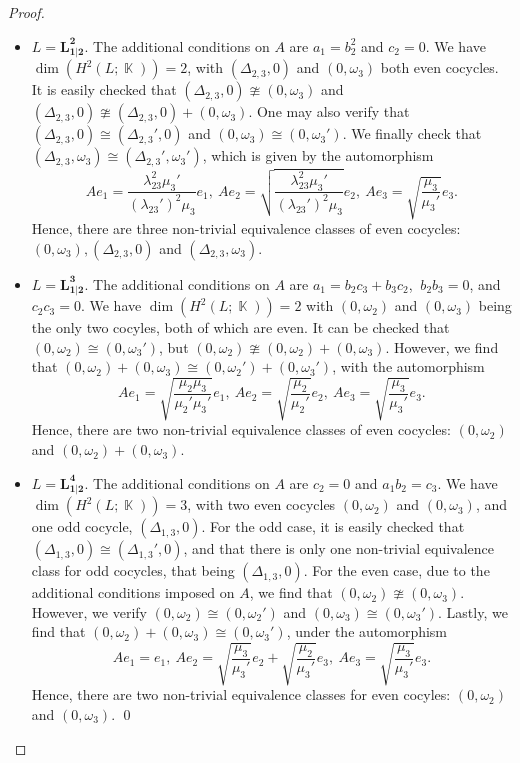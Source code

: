 \documentclass[12pt]{amsart}
\DeclareMathOperator{\K}{\mathbb{K}}
\begin{document}
{\begin{proof}
\begin{itemize}
\item $L=\mathbf{L^{2}_{1|2}}$. The additional conditions on $A$ are $a_1=b_2^2$ and $c_2=0$. We have $\dim\left(H^2_{}(L;\K)\right)=2$, with $(\Delta_{2,3},0)$ and $(0, \omega_3)$ both even cocycles. It is easily checked that $(\Delta_{2,3},0) \ncong (0, \omega_3)$ and $(\Delta_{2,3},0) \ncong (\Delta_{2,3},0) +(0, \omega_3)$. One may also verify that $(\Delta_{2,3},0)\cong(\Delta_{2,3}',0)$ and $(0,\omega_3) \cong (0,\omega_3')$. We finally check that $(\Delta_{2,3},\omega_3)\cong(\Delta_{2,3}',\omega_3')$, which is given by the automorphism
$$Ae_1=\frac{\lambda_{23}^2\mu_3'}{(\lambda_{23}')^2\mu_3}e_1, ~Ae_2=\sqrt{\frac{\lambda_{23}^2\mu_3'}{(\lambda_{23}')^2\mu_3}}e_2, ~Ae_3=\sqrt{\frac{\mu_3}{\mu_3'}}e_3.$$ 
Hence, there are three non-trivial equivalence classes of even cocycles: $(0,\omega_3), (\Delta_{2,3},0)$ and $(\Delta_{2,3},\omega_3)$.

\vspace{0.5 em}

\item $L=\mathbf{L^{3}_{1|2}}$. The additional conditions on $A$ are $a_1=b_2c_3+b_3c_2$, $~b_2b_3=0$, and $c_2c_3=0$. We have $\dim\left(H^2_{}(L;\K)\right)=2$ with $(0,\omega_2)$ and $(0, \omega_3)$ being the only two cocyles, both of which are even. It can be checked that $(0,\omega_2) \cong (0,\omega_3')$, but $(0,\omega_2) \ncong (0,\omega_2)+(0,\omega_3)$. However, we find that $(0,\omega_2)+(0,\omega_3) \cong (0,\omega_2')+(0,\omega_3')$, with the automorphism
$$Ae_1= \sqrt{\frac{\mu_2\mu_3}{\mu_2' \mu_3'}}e_1, ~Ae_2=\sqrt{\frac{\mu_2}{\mu_2'}}e_2, ~Ae_3=\sqrt{\frac{\mu_3}{\mu_3'}}e_3.$$ 
Hence, there are two non-trivial equivalence classes of even cocycles: $(0,\omega_2)$ and $(0,\omega_2)+(0,\omega_3)$.

\vspace{0.5 em}

\item $L=\mathbf{L^{4}_{1|2}}$. The additional conditions on $A$ are $c_2=0$ and $a_1b_2=c_3$. We have $\dim\left(H^2_{}(L;\K)\right)=3$, with two even cocycles $(0,\omega_2)$ and $(0,\omega_3)$, and one odd cocycle, $(\Delta_{1,3},0)$. For the odd case, it is easily checked that $(\Delta_{1,3},0)\cong(\Delta_{1,3}',0)$, and that there is only one non-trivial equivalence class for odd cocycles, that being $(\Delta_{1,3},0)$. For the even case, due to the additional conditions imposed on $A$, we find that $(0,\omega_2)\ncong(0,\omega_3)$. However, we verify $(0,\omega_2) \cong (0,\omega_2')$ and $(0,\omega_3) \cong (0,\omega_3')$. Lastly, we find that $  (0,\omega_2)+(0,\omega_3) \cong (0,\omega_3')$, under the automorphism
$$Ae_1=e_1, ~Ae_2=\sqrt{\frac{\mu_3}{\mu_3'}}e_2+\sqrt{\frac{\mu_2}{\mu_3'}}e_3, ~Ae_3=\sqrt{\frac{\mu_3}{\mu_3'}}e_3.$$
Hence, there are two non-trivial equivalence classes for even cocyles: $(0,\omega_2)$ and $(0,\omega_3)$. \qed
\end{itemize}\noqed \end{proof}

}
\end{document}
